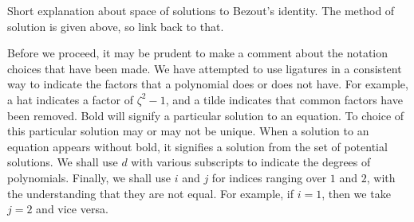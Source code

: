Short explanation about space of solutions to Bezout's identity. The method of solution is given above, so link back to that.

Before we proceed, it may be prudent to make a comment about the notation choices that have been made. We have attempted to use ligatures in a consistent way to indicate the factors that a polynomial does or does not have. For example, a hat indicates a factor of $ζ^2-1$, and a tilde indicates that common factors have been removed. Bold will signify a particular solution to an equation. To choice of this particular solution may or may not be unique. When a solution to an equation appears without bold, it signifies a solution from the set of potential solutions. We shall use $d$ with various subscripts to indicate the degrees of polynomials. Finally, we shall use $i$ and $j$ for indices ranging over $1$ and $2$, with the understanding that they are not equal. For example, if $i=1$, then we take $j=2$ and vice versa.




